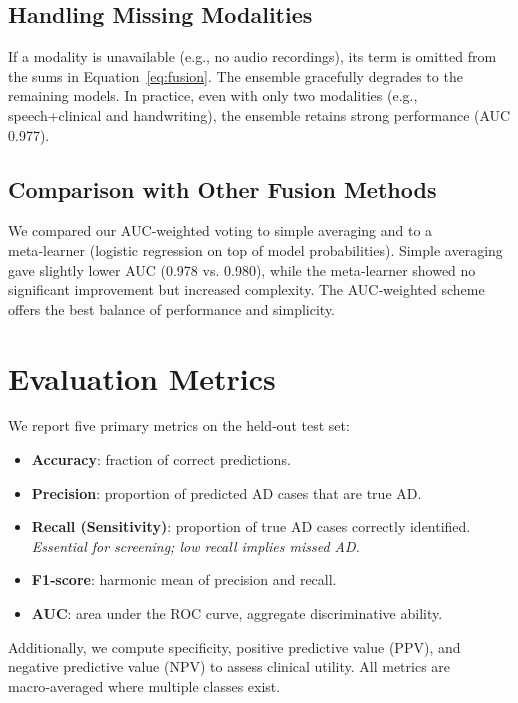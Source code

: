\documentclass[conference]{IEEEtran}
\begin{document}
\subsection{Handling Missing Modalities}
If a modality is unavailable (e.g., no audio recordings), its term is omitted from the sums in Equation~\ref{eq:fusion}. The ensemble gracefully degrades to the remaining models. In practice, even with only two modalities (e.g., speech+clinical and handwriting), the ensemble retains strong performance (AUC 0.977).

\subsection{Comparison with Other Fusion Methods}
We compared our AUC‑weighted voting to simple averaging and to a meta‑learner (logistic regression on top of model probabilities). Simple averaging gave slightly lower AUC (0.978 vs. 0.980), while the meta‑learner showed no significant improvement but increased complexity. The AUC‑weighted scheme offers the best balance of performance and simplicity.

\section{Evaluation Metrics}
We report five primary metrics on the held‑out test set:
\begin{itemize}
  \item \textbf{Accuracy}: fraction of correct predictions.
  \item \textbf{Precision}: proportion of predicted AD cases that are true AD.
  \item \textbf{Recall (Sensitivity)}: proportion of true AD cases correctly identified. \emph{Essential for screening; low recall implies missed AD.}
  \item \textbf{F1‑score}: harmonic mean of precision and recall.
  \item \textbf{AUC}: area under the ROC curve, aggregate discriminative ability.
\end{itemize}
Additionally, we compute specificity, positive predictive value (PPV), and negative predictive value (NPV) to assess clinical utility. All metrics are macro‑averaged where multiple classes exist.

\end{document}
